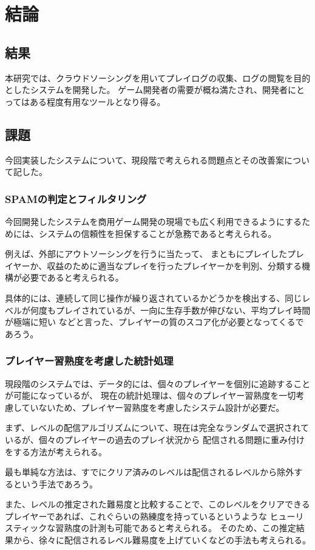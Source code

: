 \chapter{結論}

\section{結果}
本研究では、クラウドソーシングを用いてプレイログの収集、ログの閲覧を目的としたシステムを開発した。
ゲーム開発者の需要が概ね満たされ、開発者にとってはある程度有用なツールとなり得る。

\section{課題}
今回実装したシステムについて、現段階で考えられる問題点とその改善案について記した。


\subsection{SPAMの判定とフィルタリング}
今回開発したシステムを商用ゲーム開発の現場でも広く利用できるようにするためには、システムの信頼性を担保することが急務であると考えられる。

例えば、外部にアウトソーシングを行うに当たって、
まともにプレイしたプレイヤーか、収益のために適当なプレイを行ったプレイヤーかを判別、分類する機構が必要であると考えられる。

具体的には、連続して同じ操作が繰り返されているかどうかを検出する、同じレベルが何度もプレイされているが、一向に生存手数が伸びない、平均プレイ時間が極端に短い
などと言った、プレイヤーの質のスコア化が必要となってくるであろう。


\subsection{プレイヤー習熟度を考慮した統計処理}
現段階のシステムでは、データ的には、個々のプレイヤーを個別に追跡することが可能になっているが、
現在の統計処理は、個々のプレイヤー習熟度を一切考慮していないため、プレイヤー習熟度を考慮したシステム設計が必要だ。

まず、レベルの配信アルゴリズムについて、現在は完全なランダムで選択されているが、個々のプレイヤーの過去のプレイ状況から
配信される問題に重み付けをする方法が考えられる。

最も単純な方法は、すでにクリア済みのレベルは配信されるレベルから除外するという手法であろう。


また、レベルの推定された難易度と比較することで、このレベルをクリアできるプレイヤーであれば、これぐらいの熟練度を持っているというような
ヒューリスティックな習熟度の計測も可能であると考えられる。
そのため、この推定結果から、徐々に配信されるレベル難易度を上げていくなどの手法も考えられる。


